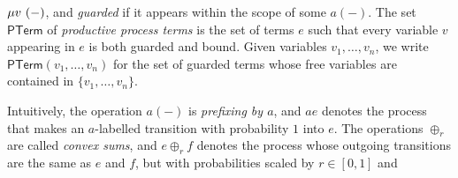 \hypertarget{html:S3.SS0.SSS0.Px1.p1.m7}{}\({\mu v\leavevmode\nobreak\ (-)}\), and \emph{guarded} if it appears within the scope of some %
\hypertarget{html:S3.SS0.SSS0.Px1.p1.m8}{}\({a(-)}\). The set %
\hypertarget{html:S3.SS0.SSS0.Px1.p1.m9}{}\({\mathsf{PTerm}}\) of \emph{productive process terms} is the set of terms %
\hypertarget{html:S3.SS0.SSS0.Px1.p1.m10}{}\({e}\) such that every variable %
\hypertarget{html:S3.SS0.SSS0.Px1.p1.m11}{}\({v}\) appearing in %
\hypertarget{html:S3.SS0.SSS0.Px1.p1.m12}{}\({e}\) is both guarded and bound. Given variables %
\hypertarget{html:S3.SS0.SSS0.Px1.p1.m13}{}\({v_{1},\dots,v_{n}}\), we write %
\hypertarget{html:S3.SS0.SSS0.Px1.p1.m14}{}\({\mathsf{PTerm}(v_{1},\dots,v_{n})}\) for the set of guarded terms whose free variables are contained in %
\hypertarget{html:S3.SS0.SSS0.Px1.p1.m15}{}\({\{v_{1},\dots,v_{n}\}}\).
\par\medskip
\hypertarget{html:S3.SS0.SSS0.Px1.p2}{} Intuitively, the operation %
\hypertarget{html:S3.SS0.SSS0.Px1.p2.m1}{}\({a(-)}\) is \emph{prefixing by %
\hypertarget{html:S3.SS0.SSS0.Px1.p2.m2}{}\({a}\)}, and %
\hypertarget{html:S3.SS0.SSS0.Px1.p2.m3}{}\({ae}\) denotes the process that makes an %
\hypertarget{html:S3.SS0.SSS0.Px1.p2.m4}{}\({a}\)-labelled transition with probability %
\hypertarget{html:S3.SS0.SSS0.Px1.p2.m5}{}\({1}\) into %
\hypertarget{html:S3.SS0.SSS0.Px1.p2.m6}{}\({e}\). The operations %
\hypertarget{html:S3.SS0.SSS0.Px1.p2.m7}{}\({\oplus_{r}}\) are called \emph{convex sums}, and %
\hypertarget{html:S3.SS0.SSS0.Px1.p2.m8}{}\({e\oplus_{r}f}\) denotes the process whose outgoing transitions are the same as %
\hypertarget{html:S3.SS0.SSS0.Px1.p2.m9}{}\({e}\) and %
\hypertarget{html:S3.SS0.SSS0.Px1.p2.m10}{}\({f}\), but with probabilities scaled by %
\hypertarget{html:S3.SS0.SSS0.Px1.p2.m11}{}\({r\in[0,1]}\) and %
